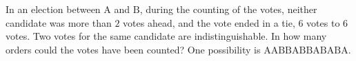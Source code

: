 In an election between $\text{A}$ and $\text{B}$,  during the counting of the votes, neither candidate was more than $2$ votes ahead, and the vote ended in a tie, $6$ votes to $6$ votes. Two votes for the same candidate are indistinguishable. In how many orders could the votes have been counted? One possibility is $\text{AABBABBABABA}$.